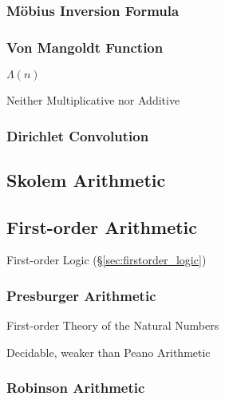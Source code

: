 \subsubsection{M\"obius Inversion Formula}
\label{sec:mobius_inversion}

\subsubsection{Von Mangoldt Function}\label{sec:vonmangoldt_function}

$\Lambda(n)$

Neither Multiplicative nor Additive



\subsubsection{Dirichlet Convolution}\label{sec:dirichlet_convolution}



\subsection{Skolem Arithmetic}\label{sec:skolem_arithmetic}
\cite{skolem23}

\subsection{First-order Arithmetic}\label{sec:firstorder_arithmetic}

First-order Logic (\S\ref{sec:firstorder_logic})



\subsubsection{Presburger Arithmetic}\label{sec:presburger_arithmetic}

First-order Theory of the Natural Numbers

Decidable, weaker than Peano Arithmetic



\subsubsection{Robinson Arithmetic}\label{sec:robinson_arithmetic}

